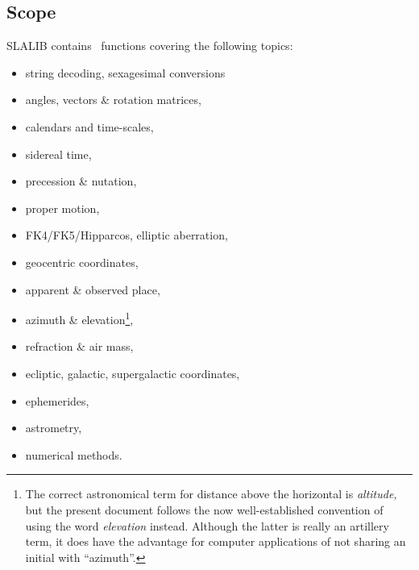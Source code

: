 \documentclass[11pt,fleqn,twoside]{article}
\renewcommand{\_}{{\tt\char'137}}     %
\begin{document}
\subsection{Scope}
SLALIB contains \nroutines\ functions covering the following topics:
\begin{itemize}
\item string decoding,
      sexagesimal conversions
\item angles, vectors \& rotation matrices,
\item calendars and time-scales,
\item sidereal time,
\item precession \& nutation,
\item proper motion,
\item FK4/FK5/Hipparcos,
      elliptic aberration,
\item geocentric coordinates,
\item apparent \& observed place,
\item azimuth \& elevation\footnote{The correct astronomical
term for distance above the horizontal is {\it altitude,}\/ but the
present document follows the now well-established convention of
using the word {\it elevation}\/ instead.  Although the latter is
really an artillery term, it does have the advantage
for computer applications of not sharing an
initial with ``azimuth''.},
\item refraction \& air mass,
\item ecliptic,
      galactic,
      supergalactic coordinates,
\item ephemerides,
\item astrometry,
\item numerical methods.
\end{itemize}
 
\end{document}
